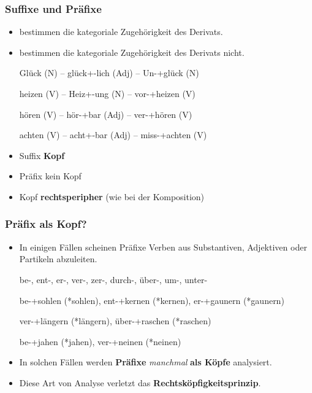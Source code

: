 \begin{frame}
\frametitle{Suffixe und Präfixe}

\begin{itemize}
	\item {} bestimmen die kategoriale Zugehörigkeit des Derivats.
	
	\item {} bestimmen \idR die kategoriale Zugehörigkeit des Derivats nicht.


	\ea Glück (N) -- glück+-lich (Adj) -- Un-+glück (N)
	\z
	
	\ea heizen (V) -- Heiz+-ung (N) -- vor-+heizen (V)
	\z
	
	\ea hören (V) -- hör-+bar (Adj) -- ver-+hören (V)
	\z
	
	\ea achten (V) -- acht+-bar (Adj) -- miss-+achten (V)
	\z

	\item Suffix \ras \textbf{Kopf}
	
	\item Präfix \ras kein Kopf

	\item Kopf  \ras \textbf{rechtsperipher} (wie bei der Komposition)
\end{itemize}

\end{frame}


\begin{frame}
\frametitle{Präfix als Kopf?}

\begin{itemize}
	\item In einigen Fällen scheinen Präfixe Verben aus Substantiven, Adjektiven oder Partikeln abzuleiten.

	\settowidth{} 			
	\ea be-, ent-, er-, ver-, zer-, durch-, über-, um-, unter- 
	\z 

		
		\ea be-+sohlen (*sohlen), ent-+kernen (*kernen), er-+gaunern (*gaunern)
		
		\jambox{[Substantivbasis]}

		\ex ver-+längern (*längern), über-+raschen (*raschen) \jambox{[Adjektivbasis]}
	
		\ex be-+jahen (*jahen), ver-+neinen (*neinen) \jambox{[Partikelbasis]}
		\z
		
\pause
\medskip

	\item In solchen Fällen werden \textbf{Präfixe} \emph{manchmal} \textbf{als Köpfe} analysiert.

	\item Diese Art von Analyse verletzt das \textbf{Rechtsköpfigkeitsprinzip}.
	
\end{itemize}

\end{frame}



